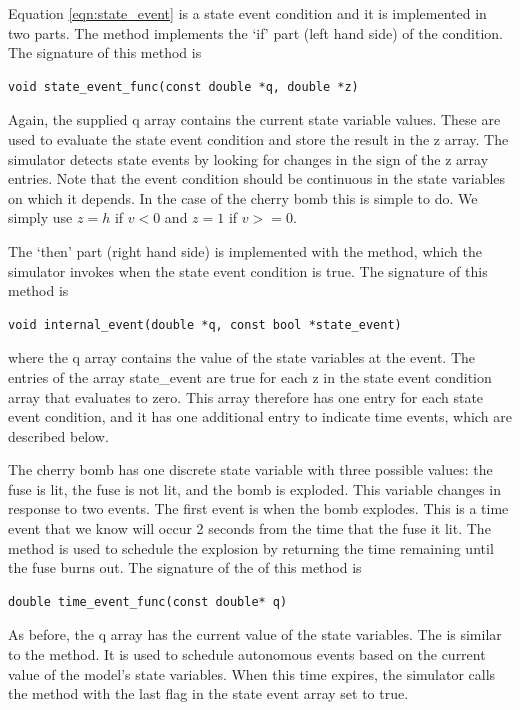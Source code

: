 Equation \ref{eqn:state_event} is a state event condition and it is implemented in two parts. The  method implements the `if' part (left hand side) of the condition. The signature of this method is
\begin{verbatim}
void state_event_func(const double *q, double *z)
\end{verbatim}
Again, the supplied q array contains the current state variable values. These are used to evaluate the state event condition and store the result in the z array. The simulator detects state events by looking for changes in the sign of the z array entries. Note that the event condition should be continuous in the state variables on which it depends. In the case of the cherry bomb this is simple to do. We simply use $z=h$ if $v < 0$ and $z=1$ if $v >= 0$.

The `then' part (right hand side) is implemented with the  method, which the simulator invokes when the state event condition is true. The signature of this method is
\begin{verbatim}
void internal_event(double *q, const bool *state_event)
\end{verbatim}
where the q array contains the value of the state variables at the event. The entries of the array state\_event are true for each z in the state event condition array that evaluates to zero. This array therefore has one entry for each state event condition, and it has one additional entry to indicate time events, which are described below.

The cherry bomb has one discrete state variable with three possible values: the fuse is lit, the fuse is not lit, and the bomb is exploded. This variable changes in response to two events. The first event is when the bomb explodes. This is a time event that we know will occur 2 seconds from the time that the fuse it lit. The  method is used to schedule the explosion by returning the time remaining until the fuse burns out. The signature of the of this method is
\begin{verbatim}
double time_event_func(const double* q)
\end{verbatim}
As before, the q array has the current value of the state variables. The  is similar to the  method. It is used to schedule autonomous events based on the current value of the model's state variables. When this time expires, the simulator calls the  method with the last flag in the state event array set to true.

